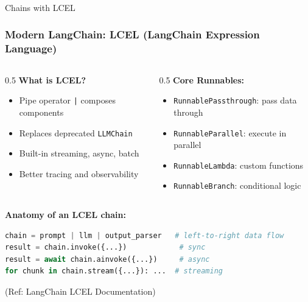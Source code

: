\begin{frame}[fragile]\frametitle{}
\begin{center}
{\Large Chains with LCEL}
\end{center}
\end{frame}

\begin{frame}[fragile]\frametitle{Modern LangChain: LCEL (LangChain Expression Language)}

\begin{columns}
  \begin{column}{0.5\textwidth}
    \textbf{What is LCEL?}
    \begin{itemize}
    \item Pipe operator \texttt{|} composes components
    \item Replaces deprecated \texttt{LLMChain}
    \item Built-in streaming, async, batch
    \item Better tracing and observability
    \end{itemize}
  \end{column}
  \begin{column}{0.5\textwidth}
    \textbf{Core Runnables:}
    \begin{itemize}
    \item \texttt{RunnablePassthrough}: pass data through
    \item \texttt{RunnableParallel}: execute in parallel
    \item \texttt{RunnableLambda}: custom functions
    \item \texttt{RunnableBranch}: conditional logic
    \end{itemize}
  \end{column}
\end{columns}

\vspace{0.3cm}
\textbf{Anatomy of an LCEL chain:}
\begin{lstlisting}[language=python,basicstyle=\tiny]
chain = prompt | llm | output_parser   # left-to-right data flow
result = chain.invoke({...})            # sync
result = await chain.ainvoke({...})     # async
for chunk in chain.stream({...}): ...  # streaming
\end{lstlisting}


{\tiny (Ref: LangChain LCEL Documentation)}
\end{frame}

